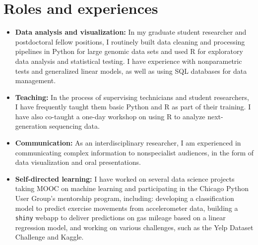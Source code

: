 \documentclass[letterpaper,12pt]{article}
\begin{document}
\section*{Roles and experiences}
\begin{itemize}
    \item \textbf{Data analysis and visualization:} In my graduate student researcher and postdoctoral fellow positions, I routinely built data cleaning and processing pipelines in Python for large genomic data sets and used R for exploratory data analysis and statistical testing. I have experience with nonparametric tests and generalized linear models, as well as using SQL databases for data management.
    \item \textbf{Teaching:} In the process of supervising technicians and student researchers, I have frequently taught them basic Python and R as part of their training. I have also co-taught a one-day workshop on using R to analyze next-generation sequencing data.
    \item \textbf{Communication:} As an interdisciplinary researcher, I am experienced in communicating complex information to nonspecialist audiences, in the form of data visualization and oral presentations.
    \item \textbf{Self-directed learning:} I have worked on several data science projects taking MOOC on machine learning and participating in the Chicago Python User Group's mentorship program, including: developing a classification model to predict exercise movements from accelerometer data, building a \texttt{shiny} webapp to deliver predictions on gas mileage based on a linear regression model, and working on various challenges, such as the Yelp Dataset Challenge and Kaggle.
\end{itemize}
\end{document}
